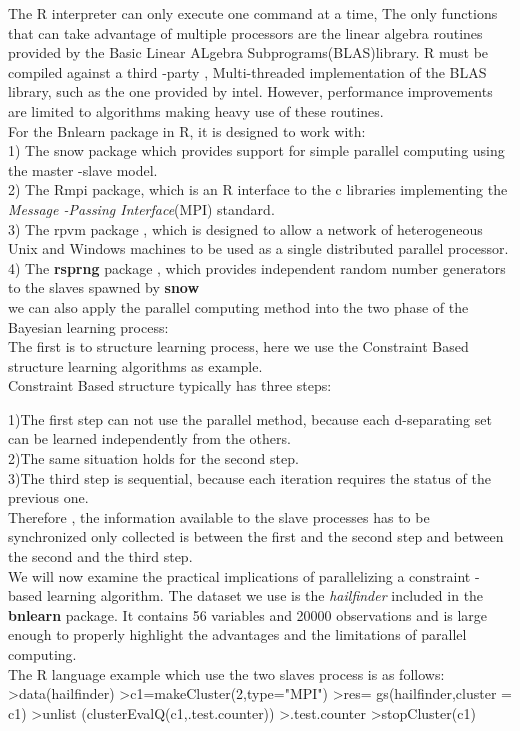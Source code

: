\documentclass[12pt]{article}
\theoremstyle{plain}
\begin{document}
The R interpreter can only execute one command at a time, The only functions that can take advantage of multiple processors are the linear algebra routines provided by the Basic Linear ALgebra Subprograms(BLAS)library. R must be compiled against a third -party , Multi-threaded implementation of the BLAS library, such as the one provided by intel. However, performance improvements are limited to algorithms making heavy use of these routines.\\
For the Bnlearn package in R, it is designed to work with:\\
1) The snow package which provides support for simple parallel computing using the master -slave model.\\
2) The Rmpi package, which is an R interface to the c libraries implementing the \textit{Message -Passing Interface}(MPI) standard.\\
3) The rpvm package , which is designed to allow a network of heterogeneous Unix and Windows machines to be used as a single distributed parallel processor.\\
4) The \textbf{rsprng} package , which provides independent random number generators to the slaves spawned by \textbf{snow}\\

we can also apply the parallel computing method into the two phase of the Bayesian learning process:\\
The first is to structure learning process, here we use the Constraint  Based structure learning algorithms as example.\\
Constraint Based structure typically has three steps:

1)The first step  can not use the parallel method, because each d-separating set can be learned independently from the others.\\
2)The same situation holds for the second step. \\
3)The third step is sequential, because each iteration requires the status of the previous one.\\
Therefore , the information available to the slave processes has to be synchronized only collected is between the first and the second step and between the second and the third step.\\
We will now examine the practical implications of parallelizing a constraint -based learning algorithm. The dataset we use is the \textit{hailfinder} included in the \textbf{bnlearn} package. It contains 56 variables and 20000 observations and is large enough to properly highlight the advantages and the limitations of parallel computing.\\
The R language example which use the two slaves process is as follows:\\
>data(hailfinder)
>c1=makeCluster(2,type="MPI")
>res= gs(hailfinder,cluster = c1)
>unlist (clusterEvalQ(c1,.test.counter))
>.test.counter
>stopCluster(c1)   
\end{document}
